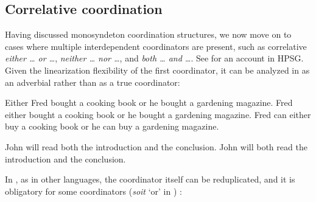 \subsection{Correlative coordination}\label{correlphr}

Having discussed monosyndeton coordination structures, we now move on to cases where
multiple interdependent coordinators are present, such as correlative \emph{either \ldots{} or \ldots{}},
\emph{neither \ldots{} nor \ldots{}}, 
and \emph{both \ldots{} and \ldots{}}. See \citet{hof} for an account  in HPSG. Given the linearization flexibility of the first coordinator, it can be analyzed in  as an adverbial rather than as a true coordinator:

\eal
\ex  Either Fred bought a cooking book or he bought a gardening magazine.
\ex  Fred either bought a cooking book or he bought a gardening magazine.
\ex  Fred can either buy a cooking book or he can buy a gardening magazine.
\zl
{}

\eal
\ex John will read both the introduction and the conclusion.
\ex John will both read the introduction and the conclusion.
\zl



\noindent
In , as in other  languages, the coordinator itself can be reduplicated, and it is
obligatory for some coordinators (\emph{soit} `or' in ) \parencites{Mouret:05}[--206]{Bilbiie:17}:

\eal
{}
\zl


